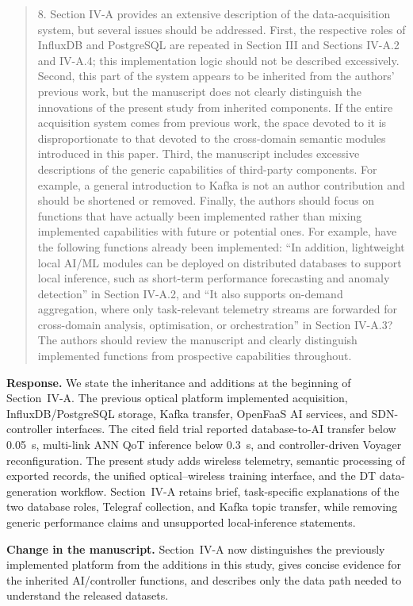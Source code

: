 \documentclass[11pt]{article}
\newenvironment{reviewercomment}{\begin{quote}\color{reviewblue}}{\end{quote}}
\newenvironment{authorresponse}{\color{responsegreen}\textbf{Response.} }{\par\color{black}}
\newcommand{\change}[1]{\par\textbf{Change in the manuscript.} #1\par}
\begin{document}
\begin{reviewercomment}
8. Section IV-A provides an extensive description of the data-acquisition system, but several issues should be addressed. First, the respective roles of InfluxDB and PostgreSQL are repeated in Section III and Sections IV-A.2 and IV-A.4; this implementation logic should not be described excessively. Second, this part of the system appears to be inherited from the authors' previous work, but the manuscript does not clearly distinguish the innovations of the present study from inherited components. If the entire acquisition system comes from previous work, the space devoted to it is disproportionate to that devoted to the cross-domain semantic modules introduced in this paper. Third, the manuscript includes excessive descriptions of the generic capabilities of third-party components. For example, a general introduction to Kafka is not an author contribution and should be shortened or removed. Finally, the authors should focus on functions that have actually been implemented rather than mixing implemented capabilities with future or potential ones. For example, have the following functions already been implemented: ``In addition, lightweight local AI/ML modules can be deployed on distributed databases to support local inference, such as short-term performance forecasting and anomaly detection'' in Section IV-A.2, and ``It also supports on-demand aggregation, where only task-relevant telemetry streams are forwarded for cross-domain analysis, optimisation, or orchestration'' in Section IV-A.3? The authors should review the manuscript and clearly distinguish implemented functions from prospective capabilities throughout.
\end{reviewercomment}
\begin{authorresponse}
We state the inheritance and additions at the beginning of Section~IV-A. The previous optical platform implemented acquisition, InfluxDB/PostgreSQL storage, Kafka transfer, OpenFaaS AI services, and SDN-controller interfaces. The cited field trial reported database-to-AI transfer below 0.05~s, multi-link ANN QoT inference below 0.3~s, and controller-driven Voyager reconfiguration. The present study adds wireless telemetry, semantic processing of exported records, the unified optical--wireless training interface, and the DT data-generation workflow. Section~IV-A retains brief, task-specific explanations of the two database roles, Telegraf collection, and Kafka topic transfer, while removing generic performance claims and unsupported local-inference statements.
\end{authorresponse}
\change{Section~IV-A now distinguishes the previously implemented platform from the additions in this study, gives concise evidence for the inherited AI/controller functions, and describes only the data path needed to understand the released datasets.}
\end{document}
